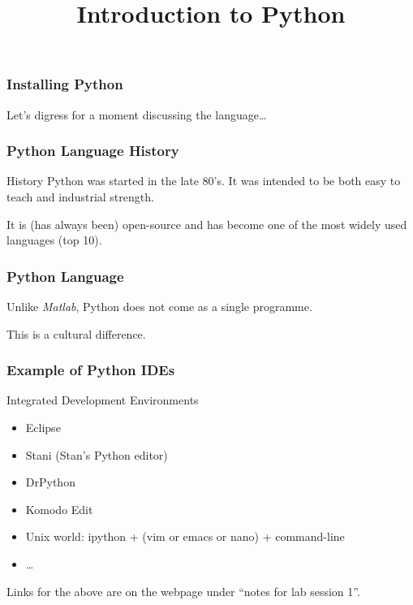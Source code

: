 
\title{Introduction to Python}


\frame{\frametitle}

\begin{frame}[fragile]
\frametitle{Installing Python}

Let's digress for a moment discussing the language\ldots
\end{frame}


\begin{frame}[fragile]
\frametitle{Python Language History}

\begin{block}{History}
Python was started in the late 80's. It was intended to be both \alert{easy to teach} and \alert{industrial strength}.

It is (has always been) open-source and has become one of the most widely used languages (top 10).
\end{block}
\end{frame}

\begin{frame}[fragile]
\frametitle{Python Language}

Unlike \textit{Matlab}, Python does not come as a single programme.

This is a cultural difference.

\end{frame}

\begin{frame}[fragile]
\frametitle{Example of Python IDEs}

\begin{block}{Integrated Development Environments}
\begin{itemize}
\item Eclipse
\item Stani (Stan's Python editor)
\item DrPython
\item Komodo Edit
\item Unix world: ipython + (vim or emacs or nano) + command-line
\item \ldots
\end{itemize}
\end{block}

Links for the above are on the webpage under ``notes for lab session 1''.
\end{frame}

